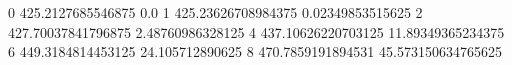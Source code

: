 0 425.2127685546875 0.0
1 425.23626708984375 0.02349853515625
2 427.70037841796875 2.48760986328125
4 437.10626220703125 11.89349365234375
6 449.3184814453125 24.105712890625
8 470.7859191894531 45.573150634765625
